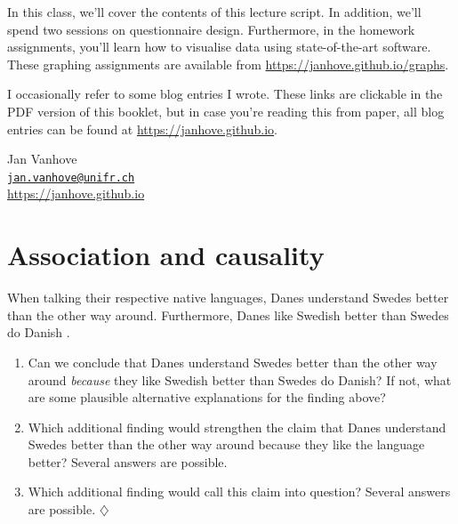 \documentclass[a4paper]{tufte-book}\usepackage[]{graphicx}\usepackage[]{xcolor}
\newcommand*{\parend}[1][$\diamondsuit$]{%
  \unskip\nobreak\hspace{1em plus 1fill}$\diamondsuit$%
}
\begin{document}
In this class, we'll cover the contents of this lecture script.
In addition, we'll spend two sessions on questionnaire design.
Furthermore, in the homework assignments, you'll learn how to visualise data 
using state-of-the-art software. 
These graphing assignments are available from \url{https://janhove.github.io/graphs}.

I occasionally refer to some blog entries I wrote.
These links are clickable in the PDF version of this booklet,
but in case you're reading this from paper, all blog entries
can be found at \url{https://janhove.github.io}.

\medskip

\begin{flushright}
Jan Vanhove\\
\href{mailto:jan.vanhove@unifr.ch}{\texttt{jan.vanhove@unifr.ch}}\\
\url{https://janhove.github.io}
\end{flushright}

{\fontsize{9.5pt}{11pt}\selectfont
  \tableofcontents
}





\mainmatter


\chapter{Association and causality}\label{ch:causality}

\label{ex:scandinavia}
When talking their respective native languages, 
Danes understand Swedes better than the other way around. 
Furthermore, Danes like Swedish better than Swedes do Danish 
\citep[see, e.g.,][]{Delsing2005}.

\begin{enumerate}
\item Can we conclude that Danes understand Swedes better
      than the other way around \emph{because} they like Swedish better
      than Swedes do Danish?
      If not, what are some plausible alternative explanations for the finding
      above?

\item Which additional finding would strengthen the claim that 
      Danes understand Swedes better than the other way around because they 
      like the language better? Several answers are possible.
\item Which additional finding would call this claim into question?
      Several answers are possible.\parend{}
\end{enumerate}
\end{document}
